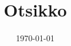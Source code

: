\documentclass{tktltiki}
\begin{document}
\doublespacing

\title{Otsikko}
\author{}
\date{\today}

\maketitle



\newpage
 



\lastpage

\appendices

\pagestyle{empty}

\end{document}
